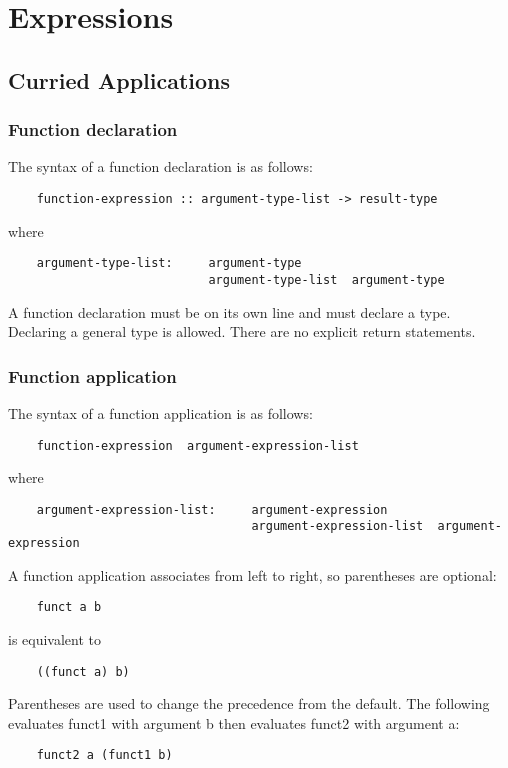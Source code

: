 \section{Expressions}


\subsection{Curried Applications}

    \subsubsection{Function declaration}
    The syntax of a function declaration is as follows: 
    \begin{verbatim} 
    function-expression :: argument-type-list -> result-type 
    \end{verbatim} 
    where
    \begin{verbatim}
    argument-type-list:     argument-type
                            argument-type-list  argument-type
    \end{verbatim} 
A function declaration must be on its own line and must declare a type. Declaring a general type is allowed. There are no explicit return statements.
  
    \subsubsection{Function application}
    The syntax of a function application is as follows: 
    \begin{verbatim}
    function-expression  argument-expression-list \end{verbatim} 
    where
    \begin{verbatim}
    argument-expression-list:     argument-expression
                                  argument-expression-list  argument-expression
    \end{verbatim} 
A function application associates from left to right, so parentheses are optional: 
    \begin{verbatim}
    funct a b
    \end{verbatim}
    is equivalent to
    \begin{verbatim}
    ((funct a) b) 
    \end{verbatim}
    Parentheses are used to change the precedence from the default. The following evaluates funct1 with argument b then evaluates funct2 with argument a:
    \begin{verbatim}
    funct2 a (funct1 b)
    \end{verbatim}   

